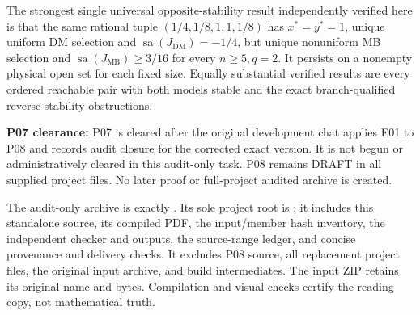 \documentclass[11pt]{article}
\newcommand{\DM}{\mathrm{DM}}
\newcommand{\MB}{\mathrm{MB}}
\newcommand{\sa}{\operatorname{sa}}
\begin{document}
The strongest single universal opposite-stability result independently
verified here is that the same rational tuple
$(1/4,1/8,1,1,1/8)$ has $x^*=y^*=1$, unique uniform DM selection
and $\sa(J_{\DM})=-1/4$, but unique nonuniform MB selection and
$\sa(J_{\MB})\ge3/16$ for every $n\ge5,q=2$. It persists on a
nonempty physical open set for each fixed size. Equally substantial
verified results are every ordered reachable pair with both models
stable and the exact branch-qualified reverse-stability obstructions.

\textbf{P07 clearance:} P07 is cleared after the original development
chat applies E01 to P08 and records audit closure for the corrected exact
version. It is not begun or
administratively cleared in this audit-only task. P08 remains DRAFT in
all supplied project files. No later proof or full-project audited
archive is created.

The audit-only archive is exactly
. Its sole project root
is ; it includes this standalone source,
its compiled PDF, the input/member hash inventory, the independent
checker and outputs, the source-range ledger, and concise provenance
and delivery checks. It excludes P08 source, all replacement project
files, the original input archive, and build intermediates. The input
ZIP retains its original name and bytes. Compilation and visual checks
certify the reading copy, not mathematical truth.
\end{document}
